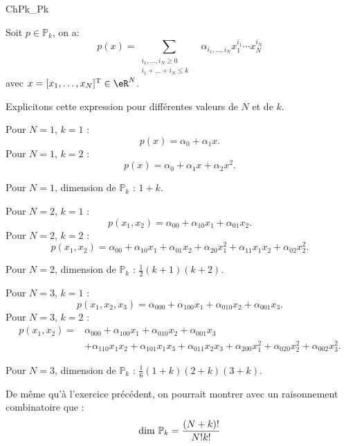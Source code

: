 \begin{corrige}{ChPk_Pk}

Soit $p \in \mathbb{P}_k$, on a:
\[
p(x) = \sum_{\substack{i_1,\ldots,i_N\geq0 \\ i_1+\ldots+i_N\leq k\phantom{-}}} \alpha_{i_1 , \ldots , i_N} x_1^{i_1} \cdots x_N^{i_N}
\]
avec $x=[x_1,\ldots,x_N]^\mathrm{T}\in \eR^N$.

\medskip

Explicitons cette expression pour différentes valeurs de $N$ et de $k$.

\medskip

Pour $N=1$, $k=1$ : 
\[
p(x) = \alpha_0 + \alpha_1 x .
\]
Pour $N=1$, $k=2$ : 
\[
p(x) = \alpha_0 + \alpha_1 x + \alpha_2 x^2.
\]

Pour $N=1$, dimension de $\mathbb{P}_k$ : $1+k$.

\bigskip

Pour $N=2$, $k=1$ : 
\[
p(x_1,x_2) = \alpha_{00} + \alpha_{10} x_1 + \alpha_{01} x_2.
\]
Pour $N=2$, $k=2$ : 
\[
p(x_1,x_2) = \alpha_{00} + \alpha_{10} x_1 + \alpha_{01} x_2
+ \alpha_{20} x_1^2 + \alpha_{11} x_1 x_2 + \alpha_{02} x_2^2. 
\]

Pour $N=2$, dimension de $\mathbb{P}_k$ : $\frac12 (k+1) (k+2)$.

\bigskip

Pour $N=3$, $k=1$ : 
\[
p(x_1,x_2,x_3) = \alpha_{000} + \alpha_{100} x_1 + \alpha_{010} x_2 + \alpha_{001} x_3.
\]
Pour $N=3$, $k=2$ : 
\begin{align*}
p(x_1,x_2) =&  \alpha_{000} + \alpha_{100} x_1 + \alpha_{010} x_2 + \alpha_{001} x_3\\
& 
+ \alpha_{110} x_1 x_2  + \alpha_{101} x_1 x_3
+ \alpha_{011} x_2 x_3 
+ \alpha_{200} x_1^2 + \alpha_{020} x_2^2 + \alpha_{002} x_3^2.
\end{align*}

Pour $N=3$, dimension de $\mathbb{P}_k$ : $\frac16 (1+k) (2+k) (3+k)$.

\bigskip

De même qu'à l'exercice précédent, on pourrait montrer avec un raisonnement combinatoire que :
\[
\hbox{dim } \mathbb{P}_k= \frac{(N+k)!}{N!k!}
\]


\end{corrige}

\medskip

